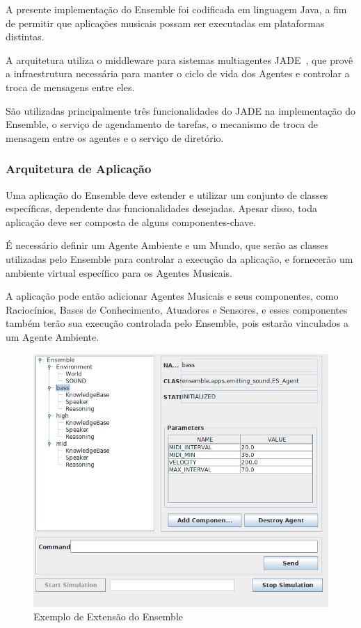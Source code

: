 \documentclass[a4paper, 11pt, twoside]{article}
\begin{document}
\begin{multicols}{2}
A presente implementação do Ensemble foi codificada em linguagem Java, a fim de
permitir que aplicações musicais possam ser executadas em plataformas 
distintas.

A arquitetura utiliza o middleware para sistemas multiagentes 
JADE~\cite{belli99}, que provê a infraestrutura necessária para manter o ciclo 
de vida dos Agentes e controlar a troca de mensagens entre eles.

São utilizadas principalmente três funcionalidades do JADE na implementação do
Ensemble, o serviço de agendamento de tarefas, o mecanismo de troca de mensagem
entre os agentes e o serviço de diretório.

\subsubsection{Arquitetura de Aplicação}

Uma aplicação do Ensemble deve estender e utilizar um conjunto de classes
específicas, dependente das funcionalidades desejadas. Apesar disso,
toda aplicação deve ser composta de alguns componentes-chave. 

É necessário definir um Agente Ambiente e um Mundo, que serão as classes
utilizadas pelo Ensemble para controlar a execução da aplicação,
e fornecerão um ambiente virtual específico para os Agentes Musicais.

A aplicação pode então adicionar Agentes Musicais e seus componentes, 
como Raciocínios, Bases de Conhecimento, Atuadores e Sensores, e esses
componentes também terão sua execução controlada pelo Ensemble, pois
estarão vinculados a um Agente Ambiente.

\begin{figure}[H]
  \centering
  \includegraphics[scale=0.35]{ensemble_sniffer_ext.jpg}
  \caption{Exemplo de Extensão do Ensemble}
  \label{fig:sniffer}
\end{figure}


\end{multicols}
\end{document}
